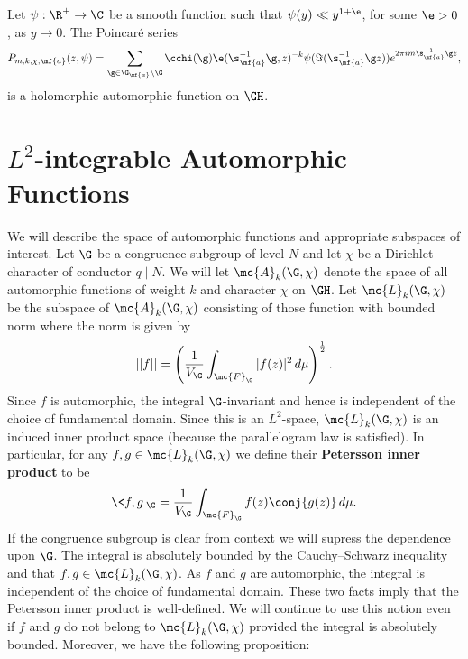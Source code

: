     \begin{theorem}
      Let $\psi:\R^{+} \to \C$ be a smooth function such that $\psi(y) \ll y^{1+\e}$, for some $\e > 0$, as $y \to 0$. The Poincar\'e series
      \[
        P_{m,k,\chi,\mf{a}}(z,\psi) = \sum_{\g \in \G_{\mf{a}}\backslash\G}\cchi(\g)\e(\s_{\mf{a}}^{-1}\g,z)^{-k}\psi(\Im(\s_{\mf{a}}^{-1}\g z))e^{2\pi im\s_{\mf{a}}^{-1}\g z},
      \]
      is a holomorphic automorphic function on $\GH$.
    \end{theorem}
  \section{\texorpdfstring{$L^{2}$}{L{2}}-integrable Automorphic Functions}
    We will describe the space of automorphic functions and appropriate subspaces of interest. Let $\G$ be a congruence subgroup of level $N$ and let $\chi$ be a Dirichlet character of conductor $q \mid N$. We will let $\mc{A}_{k}(\G,\chi)$ denote the space of all automorphic functions of weight $k$ and character $\chi$ on $\GH$. Let $\mc{L}_{k}(\G,\chi)$ be the subspace of $\mc{A}_{k}(\G,\chi)$ consisting of those function with bounded norm where the norm is given by
    \[
      ||f|| = \left(\frac{1}{V_{\G}}\int_{\mc{F}_{\G}}|f(z)|^{2}\,d\mu\right)^{\frac{1}{2}}.
    \]
    Since $f$ is automorphic, the integral $\G$-invariant and hence is independent of the choice of fundamental domain. Since this is an $L^{2}$-space, $\mc{L}_{k}(\G,\chi)$ is an induced inner product space (because the parallelogram law is satisfied). In particular, for any $f,g \in \mc{L}_{k}(\G,\chi)$ we define their \textbf{Petersson inner product} to be
    \[
      \<f,g\>_{\G} = \frac{1}{V_{\G}}\int_{\mc{F}_{\G}}f(z)\conj{g(z)}\,d\mu.
    \]
    If the congruence subgroup is clear from context we will supress the dependence upon $\G$. The integral is absolutely bounded by the Cauchy–Schwarz inequality and that $f,g \in \mc{L}_{k}(\G,\chi)$. As $f$ and $g$ are automorphic, the integral is independent of the choice of fundamental domain. These two facts imply that the Petersson inner product is well-defined. We will continue to use this notion even if $f$ and $g$ do not belong to $\mc{L}_{k}(\G,\chi)$ provided the integral is absolutely bounded. Moreover, we have the following proposition:

